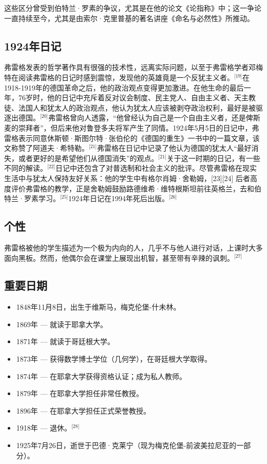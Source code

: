 这些区分曾受到伯特兰·罗素的争议，尤其是在他的论文《论指称》中；这一争论一直持续至今，尤其是由索尔·克里普基的著名讲座《命名与必然性》所推动。
\subsection{1924年日记}
弗雷格发表的哲学著作具有很强的技术性，远离实际问题，以至于弗雷格学者邓梅特在阅读弗雷格的日记时感到震惊，发现他的英雄竟是一个反犹主义者。\(^\text{[19]}\)在1918-1919年的德国革命之后，他的政治观点变得更加激进。在他生命的最后一年，76岁时，他的日记中充斥着反对议会制度、民主党人、自由主义者、天主教徒、法国人和犹太人的政治观点，他认为犹太人应该被剥夺政治权利，最好是被驱逐出德国。\(^\text{[20]}\)弗雷格曾向人透露，“他曾经认为自己是一个自由主义者，还是俾斯麦的崇拜者”，但后来他对鲁登多夫将军产生了同情。1924年5月5日的日记中，弗雷格表示同意休斯顿·斯图尔特·张伯伦的《德国的重生》一书中的一篇文章，该文称赞了阿道夫·希特勒。\(^\text{[21]}\)弗雷格在日记中记录了他认为德国的犹太人“最好消失，或者更好的是希望他们从德国消失”的观点。\(^\text{[21]}\)关于这一时期的日记，有一些不同的解读。\(^\text{[22]}\)日记中还包含了对普选制和社会主义的批评。尽管弗雷格在现实生活中与犹太人保持友好关系：他的学生中有格尔肖姆·舍勒姆，[23][24] 后者高度评价弗雷格的教学，正是舍勒姆鼓励路德维希·维特根斯坦前往英格兰，去和伯特兰·罗素学习。\(^\text{[25]}\)1924年日记在1994年死后出版。\(^\text{[26]}\)
\subsection{个性}
弗雷格被他的学生描述为一个极为内向的人，几乎不与他人进行对话，上课时大多面向黑板。然而，他偶尔会在课堂上展现出机智，甚至带有辛辣的讽刺。\(^\text{[27]}\)
\subsection{重要日期}  
\begin{itemize}
\item 1848年11月8日，出生于维斯马，梅克伦堡-什未林。  
\item 1869年 — 就读于耶拿大学。  
\item 1871年 — 就读于哥廷根大学。  
\item 1873年 — 获得数学博士学位（几何学），在哥廷根大学取得。  
\item 1874年 — 在耶拿大学获得资格认证；成为私人教师。  
\item 1879年 — 在耶拿大学担任非常任教授。  
\item 1896年 — 在耶拿大学担任正式荣誉教授。  
\item 1918年 — 退休。\(^\text{[28]}\) 
\item 1925年7月26日，逝世于巴德·克莱宁（现为梅克伦堡-前波美拉尼亚的一部分）。
\end{itemize}

